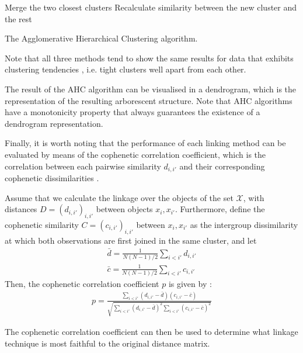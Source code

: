 \documentclass[../main.tex]{subfiles}
\begin{document}
\begin{algorithm}
\begin{algorithmic}[1]
\Repeat
\State Merge the two closest clusters
\State Recalculate similarity between the new cluster and the rest
\EndFunction
\caption{The Agglomerative Hierarchical Clustering algorithm.}\label{alg_ahc}
\end{algorithmic}
\end{algorithm}
\par Note that all three methods tend to show the same results for data that exhibits clustering tendencies \cite{hastie2008}, i.e. tight clusters well apart from each other.
\par The result of the AHC algorithm can be visualised in a dendrogram, which is the representation of the resulting arborescent structure. Note that AHC algorithms have a monotonicity property that always guarantees the existence of a dendrogram representation.
\par Finally, it is worth noting that the performance of each linking method can be evaluated by means of the cophenetic correlation coefficient, which is the correlation between each pairwise similarity $d_{i,i'}$ and their corresponding cophenetic dissimilarities \cite{hastie2008}. 
\par Assume that we calculate the linkage over the objects of the set $\mathcal{X}$, with distances $D = (d_{i, i'})_{i, i'}$ between objects $x_i, x_{i'}$. Furthermore, define the cophenetic similarity $C = (c_{i,i'})_{i, i'}$ between $x_i, x_{i'}$ as the intergroup dissimilarity at which both observations are first joined in the same cluster, and let
\begin{align*}
\bar{d} = \frac{1}{N(N-1)/2}\sum_{i < i'} d_{i, i'}\\
\bar{c} = \frac{1}{N(N-1)/2}\sum_{i < i'} c_{i, i'}
\end{align*}
Then, the cophenetic correlation coefficient $p$ is given by \cite{Mathworks2015a}:
\begin{align*}
p = \frac{\sum_{i < i'}(d_{i, i'} - \bar{d})(c_{i, i'} - \bar{c})}{\sqrt{\sum_{i < i'}(d_{i, i'} - \bar{d})^2\sum_{i < i'}(c_{i,i'} - \bar{c})^2}}
\end{align*}
\par The cophenetic correlation coefficient can then be used to determine what linkage technique is most faithful to the original distance matrix.
\end{document}
